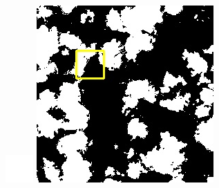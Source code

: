 \documentclass[UTF8]{ctexart}
\begin{document}
\begin{figure}[H]
{\begin{minipage}[b]{0.15\linewidth}
            \includegraphics[width=1\linewidth]{../log/spoon2/cut/tmp_cut_LC81321192014054LGN00_03055_my.jpg}\vspace{4pt}
            \includegraphics[width=1\linewidth]{../log/spoon2/cut/LC80350192014190LGN00_06561_my.jpg}\vspace{4pt}

\end{minipage}}
\end{figure}
\end{document}
